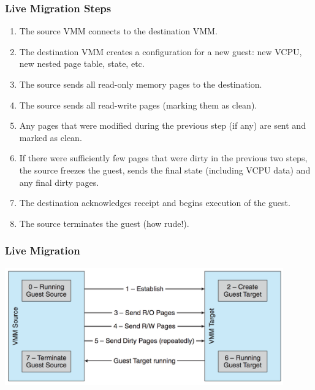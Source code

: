 \begin{frame}
\frametitle{Live Migration Steps}

\begin{enumerate}
	\item The source VMM connects to the destination VMM.
	\item The destination VMM creates a configuration for a new guest: new VCPU, new nested page table, state, etc.
	\item The source sends all read-only memory pages to the destination.
	\item The source sends all read-write pages (marking them as clean).
	\item Any pages that were modified during the previous step (if any) are sent and marked as clean. 
	\item If there were sufficiently few pages that were dirty in the previous two steps, the source freezes the guest, sends the final state (including VCPU data) and any final dirty pages.
	\item The destination acknowledges receipt and begins execution of the guest.
	\item The source terminates the guest (how rude!).
\end{enumerate}

\end{frame}

\begin{frame}
\frametitle{Live Migration}

\begin{center}
	\includegraphics[width=0.9\textwidth]{images/live-migration.png}
\end{center}

\end{frame}



